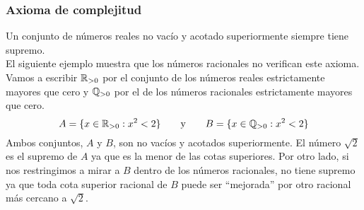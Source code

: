 \documentclass[../Teoría.root.tex]{subfiles}
\begin{document}
        \subsubsection{Axioma de complejitud}
        Un conjunto de números reales no vacío y acotado superiormente siempre tiene supremo.\\
        El siguiente ejemplo muestra que los números racionales no verifican este axioma. Vamos a escribir \(\mathbb{R}_{>0}\) por el conjunto de los números reales estrictamente mayores que cero y \(\mathbb{Q}_{>0}\) por el de los números racionales estrictamente mayores que cero.
        \[A = \{x \in \mathbb{R}_{>0} : x^2 < 2\}\qquad\text{y}\qquad B = \{x \in \mathbb{Q}_{>0} : x^2 < 2\}\]
        Ambos conjuntos, \(A\) y \(B\), son no vacíos y acotados superiormente. El número \(\sqrt{2}\) es el supremo de \(A\) ya que es la menor de las cotas superiores. Por otro lado, si nos restringimos a mirar a \(B\) dentro de los números racionales, no tiene supremo ya que toda cota superior racional de \(B\) puede ser “mejorada” por otro racional más cercano a \(\sqrt{2}\).
\end{document}
